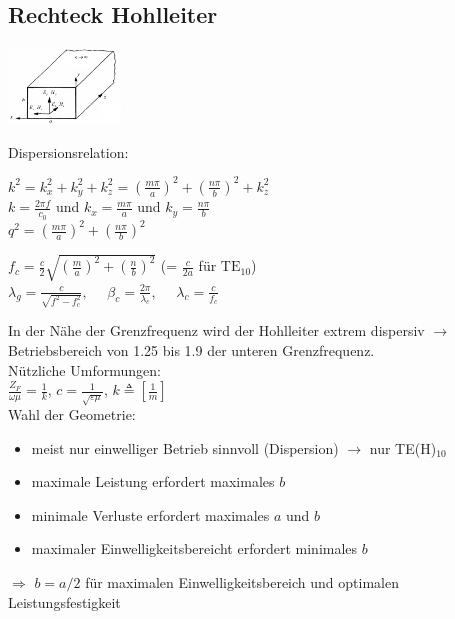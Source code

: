 \documentclass[english]{latex4ei/latex4ei_sheet}
\begin{document}
\begin{sectionbox}
    \subsection{Rechteck Hohlleiter}

    \begin{center}\includegraphics[width = 3cm]{./img/hl-orientierung.png}\end{center}

    Dispersionsrelation:
    \begin{emphbox}
        $k^2=k_x^2 + k_y^2 + k_z^2 = (\frac{m\pi}{a})^2+(\frac{n\pi}{b})^2 + k_z^2$\\
        $k = \frac{2 \pi f}{c_0}$ und $k_x = \frac{m\pi}{a}$ und $k_y = \frac{n\pi}{b}$\\
        $q^2 = (\frac{m\pi}{a})^2+(\frac{n\pi}{b})^2$
    \end{emphbox}

    \begin{emphbox}
        $f_c = \frac{c}{2}\sqrt{\left(\frac{m}{a}\right)^2+\left(\frac{n}{b}\right)^2}$ (= $\frac{c}{2a}$ für $\text{TE}_{10}$)\\
        $\lambda_g = \frac{c}{\sqrt{f^2 - f_c^2}},\quad$ $\beta_c = \frac{2\pi}{\lambda_c},\quad$ $\lambda_c = \frac{c}{f_c}$\\
    \end{emphbox}

    In der Nähe der Grenzfrequenz wird der Hohlleiter extrem dispersiv $\rightarrow$ Betriebsbereich von 1.25 bis 1.9 der unteren Grenzfrequenz.\\

    Nützliche Umformungen:\\
    $\frac{Z_F}{\omega\mu} = \frac{1}{k}$,
    $c=\frac{1}{\sqrt{\varepsilon \mu}}$,
    $k \triangleq \left[\frac{1}{m}\right] $\\

    Wahl der Geometrie:
    \begin{itemize}
        \item meist nur einwelliger Betrieb sinnvoll (Dispersion) $\rightarrow$ nur TE(H)$_{10}$
        \item maximale Leistung erfordert maximales $b$
        \item minimale Verluste erfordert maximales $a$ und $b$
        \item maximaler Einwelligkeitsbereicht erfordert minimales $b$
    \end{itemize}
    $\Rightarrow$ $b = a / 2$ für maximalen Einwelligkeitsbereich und optimalen Leistungsfestigkeit\\


\end{sectionbox}
\end{document}
